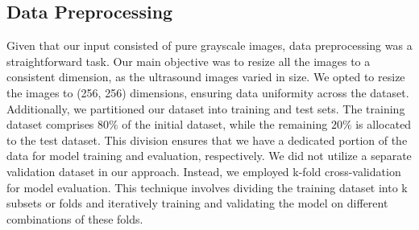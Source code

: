 \subsection{Data Preprocessing}
Given that our input consisted of pure grayscale images, data preprocessing was a straightforward task. Our main objective was to resize all the images to a consistent dimension, as the ultrasound images varied in size. We opted to resize the images to (256, 256) dimensions, ensuring data uniformity across the dataset. Additionally, we partitioned our dataset into training and test sets. The training dataset comprises $80 \%$ of the initial dataset, while the remaining $20 \%$ is allocated to the test dataset. This division ensures that we have a dedicated portion of the data for model training and evaluation, respectively. We did not utilize a separate validation dataset in our approach. Instead, we employed k-fold cross-validation for model evaluation. This technique involves dividing the training dataset into k subsets or folds and iteratively training and validating the model on different combinations of these folds. 

